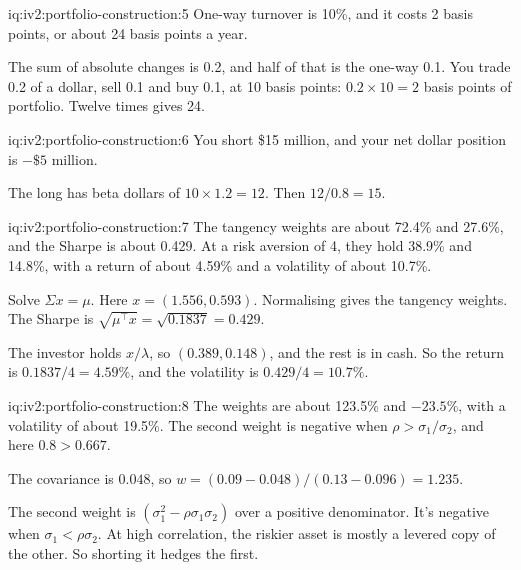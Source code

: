 \begin{solution}{iq:iv2:portfolio-construction:5}
One-way turnover is 10\%, and it costs 2 basis points, or about 24 basis points a year.

The sum of absolute changes is 0.2, and half of that is the one-way 0.1. You trade 0.2 of a dollar, sell 0.1 and buy 0.1, at 10 basis points: $0.2 \times 10 = 2$ basis points of portfolio. Twelve times gives 24.

\end{solution}

\begin{solution}{iq:iv2:portfolio-construction:6}
You short \$15 million, and your net dollar position is $-\$5$ million.

The long has beta dollars of $10 \times 1.2 = 12$. Then $12/0.8 = 15$.

\end{solution}

\begin{solution}{iq:iv2:portfolio-construction:7}
The tangency weights are about 72.4\% and 27.6\%, and the Sharpe is about 0.429. At a risk aversion of 4, they hold 38.9\% and 14.8\%, with a return of about 4.59\% and a volatility of about 10.7\%.

Solve $\Sigma x = \mu$. Here $x = (1.556, 0.593)$. Normalising gives the tangency weights. The Sharpe is $\sqrt{\mu^\top x} = \sqrt{0.1837} = 0.429$.

The investor holds $x/\lambda$, so $(0.389, 0.148)$, and the rest is in cash. So the return is $0.1837/4 = 4.59\%$, and the volatility is $0.429/4 = 10.7\%$.

\end{solution}

\begin{solution}{iq:iv2:portfolio-construction:8}
The weights are about 123.5\% and $-23.5\%$, with a volatility of about 19.5\%. The second weight is negative when $\rho > \sigma_1/\sigma_2$, and here $0.8 > 0.667$.

The covariance is $0.048$, so $w = (0.09 - 0.048)/(0.13 - 0.096) = 1.235$.

The second weight is $(\sigma_1^2 - \rho\sigma_1\sigma_2)$ over a positive denominator. It's negative when $\sigma_1 < \rho\sigma_2$. At high correlation, the riskier asset is mostly a levered copy of the other. So shorting it hedges the first.

\end{solution}

